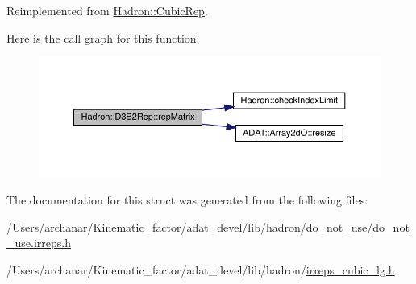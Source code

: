 Reimplemented from \mbox{\hyperlink{structHadron_1_1CubicRep_ac5d7e9e6f4ab1158b5fce3e4ad9e8005}{Hadron\+::\+Cubic\+Rep}}.

Here is the call graph for this function\+:
\nopagebreak
\begin{figure}[H]
\begin{center}
\leavevmode
\includegraphics[width=350pt]{d3/d61/structHadron_1_1D3B2Rep_a3e946b6e27ca026d8e7b1bcd02471deb_cgraph}
\end{center}
\end{figure}


The documentation for this struct was generated from the following files\+:\begin{DoxyCompactItemize}
\item 
/\+Users/archanar/\+Kinematic\+\_\+factor/adat\+\_\+devel/lib/hadron/do\+\_\+not\+\_\+use/\mbox{\hyperlink{do__not__use_8irreps_8h}{do\+\_\+not\+\_\+use.\+irreps.\+h}}\item 
/\+Users/archanar/\+Kinematic\+\_\+factor/adat\+\_\+devel/lib/hadron/\mbox{\hyperlink{lib_2hadron_2irreps__cubic__lg_8h}{irreps\+\_\+cubic\+\_\+lg.\+h}}\end{DoxyCompactItemize}
